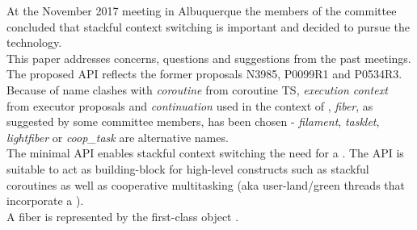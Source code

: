 
At the November 2017 meeting in Albuquerque the members of the committee
concluded that stackful context switching is important and decided to pursue the
technology.\\

This paper addresses concerns, questions and suggestions from the past meetings.
The proposed API reflects the former proposals N3985\cite{N3985},
P0099R1\cite{P0099R1} and P0534R3\cite{P0534R3}.\\
Because of name clashes with \emph{coroutine} from coroutine TS,
\emph{execution context} from executor proposals and \emph{continuation} used
in the context of , \emph{fiber}, as suggested by some
committee members, has been chosen - \emph{filament}, \emph{tasklet},
\emph{lightfiber} or \emph{coop\_task} are alternative names.\\

The minimal API enables stackful context switching  the need for a
. The API is suitable to act as building-block for high-level
constructs such as stackful coroutines as well as cooperative multitasking
(aka user-land/green threads that incorporate a ).\\

A fiber is represented by the first-class object \fiber.
